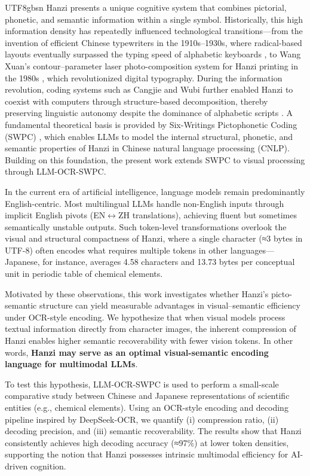 \documentclass[conference]{IEEEtran}
\begin{document}
\begin{CJK*}{UTF8}{gbsn}
Hanzi presents a unique cognitive system that combines pictorial, phonetic, and semantic information within a single symbol. Historically, this high information density has repeatedly influenced technological transitions—from the invention of efficient Chinese typewriters in the 1910s–1930s, where radical-based layouts eventually surpassed the typing speed of alphabetic keyboards \cite{mullaney2017chinese,weigang2022typewriter}, to Wang Xuan’s contour–parameter laser photo-composition system for Hanzi printing in the 1980s \cite{wangxuan1997}, which revolutionized digital typography. During the information revolution, coding systems such as Cangjie and Wubi further enabled Hanzi to coexist with computers through structure-based decomposition, thereby preserving linguistic autonomy despite the dominance of alphabetic scripts \cite{weigang2025threshold}.  A fundamental theoretical basis is provided by Six-Writings Pictophonetic Coding (SWPC) \cite{weigang2024six}, which enables LLMs to model the internal structural, phonetic, and semantic properties of Hanzi in Chinese natural language processing (CNLP). Building on this foundation, the present work extends SWPC to visual processing through LLM-OCR-SWPC.

In the current era of artificial intelligence, language models remain predominantly English-centric. Most multilingual LLMs handle non-English inputs through implicit English pivots (EN$\leftrightarrow$ZH translations), achieving fluent but sometimes semantically unstable outputs. Such token-level transformations overlook the visual and structural compactness of Hanzi, where a single character (≈3 bytes in UTF-8) often encodes what requires multiple tokens in other languages—Japanese, for instance, averages 4.58 characters and 13.73 bytes per conceptual unit in periodic table of chemical elements.

Motivated by these observations, this work investigates whether Hanzi’s picto-semantic structure can yield measurable advantages in visual–semantic efficiency under OCR-style encoding. We hypothesize that when visual models process textual information directly from character images, the inherent compression of Hanzi enables higher semantic recoverability with fewer vision tokens. In other words, \textbf{Hanzi may serve as an optimal visual-semantic encoding language for multimodal LLMs}.

To test this hypothesis, LLM-OCR-SWPC is used to perform a small-scale comparative study between Chinese and Japanese representations of scientific entities (e.g., chemical elements). Using an OCR-style encoding and decoding pipeline inspired by DeepSeek-OCR, we quantify (i) compression ratio, (ii) decoding precision, and (iii) semantic recoverability. The results show that Hanzi consistently achieves high decoding accuracy (≈97\%) at lower token densities, supporting the notion that Hanzi possesses intrinsic multimodal efficiency for AI-driven cognition.


\end{CJK*}
\end{document}

